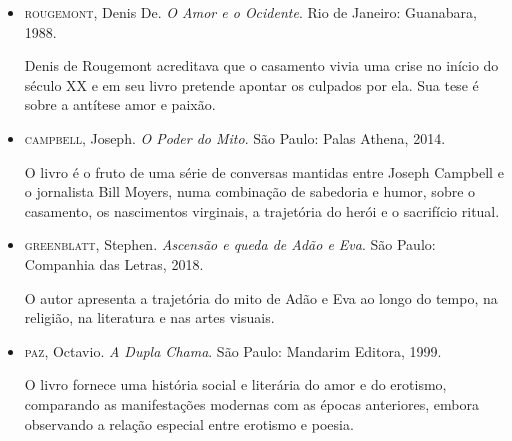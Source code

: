 \documentclass[12pt]{extarticle}
\begin{document}
\begin{itemize}
\item\textsc{rougemont}, Denis De. \textit{O Amor e o Ocidente}. Rio de Janeiro:
Guanabara, 1988.

Denis de Rougemont acreditava que o casamento vivia uma crise no início
do século XX e em seu livro pretende apontar os culpados por ela. Sua
tese é sobre a antítese amor e paixão.

\item\textsc{campbell}, Joseph. \textit{O Poder do Mito}. São Paulo: Palas Athena,
2014.

O livro é o fruto de uma série de conversas mantidas entre Joseph
Campbell e o jornalista Bill Moyers, numa combinação de sabedoria e
humor, sobre o casamento, os nascimentos virginais, a trajetória do
herói e o sacrifício ritual.

\item\textsc{greenblatt}, Stephen. \textit{Ascensão e queda de Adão e Eva}. São Paulo: Companhia das Letras, 2018.

O autor apresenta a trajetória do mito de Adão e Eva ao longo do tempo,
na religião, na literatura e nas artes visuais.

\item\textsc{paz}, Octavio. \textit{A Dupla Chama}. São Paulo: Mandarim Editora, 1999.

O livro fornece uma história social e literária do amor e do erotismo,
comparando as manifestações modernas com as épocas anteriores, embora
observando a relação especial entre erotismo e poesia.
\end{itemize}
\end{document}
